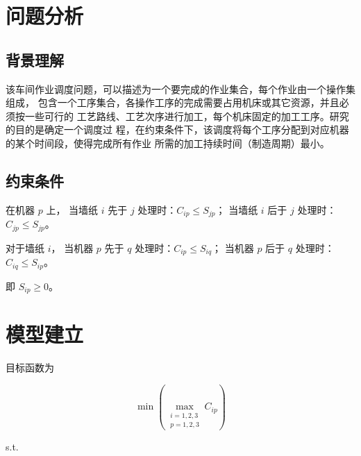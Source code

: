 \documentclass[bwprint]{cumcmthesis}    %
\begin{document}
\section{问题分析}

\subsection{背景理解}

该车间作业调度问题，可以描述为一个要完成的作业集合，每个作业由一个操作集组成，
包含一个工序集合，各操作工序的完成需要占用机床或其它资源，并且必须按一些可行的
工艺路线、工艺次序进行加工，每个机床固定的加工工序。研究的目的是确定一个调度过
程，在约束条件下，该调度将每个工序分配到对应机器的某个时间段，使得完成所有作业
所需的加工持续时间（制造周期）最小。

\subsection{约束条件}

\begin{description}[style=nextline]
    \item[约束 1，每台机器同时只能处理一种墙纸。] %
        在机器 $p$ 上，
            当墙纸 $i$ 先于 $j$ 处理时：$C_{ip} \le S_{jp}$；
            当墙纸 $i$ 后于 $j$ 处理时：$C_{jp} \le S_{jp}$。
    \item[约束 2，一种墙纸不同同时由多台机器进行处理。]
        对于墙纸 $i$，
            当机器 $p$ 先于 $q$ 处理时：$C_{ip} \le S_{iq}$；
            当机器 $p$ 后于 $q$ 处理时：$C_{iq} \le S_{ip}$。
    \item[约束 3，每种墙纸的处理时间一定非负。]
        即 $S_{ip} \ge 0$。
\end{description}

\section{模型建立}

目标函数为

$$
\min\left(\max\limits_{ \substack{ i=1,2,3\\ p=1,2,3 } } C_{ip} \right)
$$

s.t.
\end{document}
